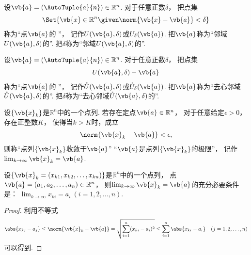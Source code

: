 \begin{definition}
设\(\vb{a}=(\AutoTuple{a}{n})\in\mathbb{R}^n\).
对于任意正数\(\delta\)，
把点集\begin{equation*}
	\Set{ \vb{x}\in\mathbb{R}^n \given \norm{\vb{x}-\vb{a}}<\delta }
\end{equation*}
称为“点\(\vb{a}\)的 ”，
记作\(U(\vb{a},\delta)\)或\(U_\delta(\vb{a})\).
把\(\vb{a}\)称为“邻域\(U(\vb{a},\delta)\)的”.
把\(\delta\)称为“邻域\(U(\vb{a},\delta)\)的”.
\end{definition}
\begin{definition}
设\(\vb{a}=(\AutoTuple{a}{n})\in\mathbb{R}^n\).
对于任意正数\(\delta\)，
把点集\begin{equation*}
	U(\vb{a},\delta) - \vb{a}
\end{equation*}
称为“点\(\vb{a}\)的 ”，
记作\(\mathring{U}(\vb{a},\delta)\)或\(\mathring{U}_\delta(\vb{a})\).
把\(\vb{a}\)称为“去心邻域\(\mathring{U}(\vb{a},\delta)\)的”.
把\(\delta\)称为“去心邻域\(\mathring{U}(\vb{a},\delta)\)的”.
\end{definition}
\begin{definition}
设\(\{\vb{x}_k\}\)是\(\mathbb{R}^n\)中的一个点列.
若存在定点\(\vb{a}\in\mathbb{R}^n\)，
对于任意给定\(\epsilon>0\)，存在正整数\(K\)，
使得当\(k>K\)时，成立\begin{equation*}
	\norm{\vb{x}_k-\vb{a}}<\epsilon,
\end{equation*}
则称“点列\(\{\vb{x}_k\}\)收敛于\(\vb{a}\)”
“\(\vb{a}\)是点列\(\{\vb{x}_k\}\)的极限”，
记作\(\lim_{k\to\infty} \vb{x}_k = \vb{a}\).
\end{definition}
\begin{theorem}
设\(\{\vb{x}_k=(x_{k1},x_{k2},\dotsc,x_{kn})\}\)是\(\mathbb{R}^n\)中的一个点列，
点\(\vb{a}=(a_1,a_2,\dotsc,a_n)\in\mathbb{R}^n\)，
则\(\lim_{k\to\infty} \vb{x}_k = \vb{a}\)的充分必要条件是：
\(\lim_{k\to\infty} x_{ki} = a_i\ (i=1,2,\dotsc,n)\).
\begin{proof}
利用不等式\begin{equation*}
	\abs{x_{kj}-a_j}
	\leq \norm{\vb{x}_k-\vb{a}}
	= \sqrt{\sum_{i=1}^n (x_{ki}-a_i)^2}
	\leq \sum_{i=1}^n \abs{x_{ki}-a_i}
	\quad(j=1,2,\dotsc,n)
\end{equation*}可以得到.
\end{proof}
\end{theorem}

